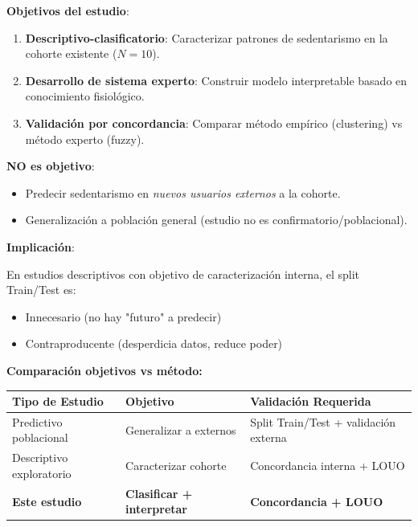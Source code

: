 \documentclass[12pt,letterpaper,twoside]{report}
\begin{document}
\begin{reglabox}
\textbf{Objetivos del estudio}:

\begin{enumerate}[noitemsep]
    \item \textbf{Descriptivo-clasificatorio}: Caracterizar patrones de sedentarismo en la cohorte existente ($N=10$).
    \item \textbf{Desarrollo de sistema experto}: Construir modelo interpretable basado en conocimiento fisiológico.
    \item \textbf{Validación por concordancia}: Comparar método empírico (clustering) vs método experto (fuzzy).
\end{enumerate}

\textbf{NO es objetivo}:
\begin{itemize}[noitemsep]
    \item Predecir sedentarismo en \textit{nuevos usuarios externos} a la cohorte.
    \item Generalización a población general (estudio no es confirmatorio/poblacional).
\end{itemize}

\textbf{Implicación}:

En estudios descriptivos con objetivo de caracterización interna, el split Train/Test es:
\begin{itemize}[noitemsep]
    \item Innecesario (no hay "futuro" a predecir)
    \item Contraproducente (desperdicia datos, reduce poder)
\end{itemize}
\end{reglabox}

\begin{calculobox}
\textbf{Comparación objetivos vs método:}

\begin{table}[H]
\centering
\begin{tabular}{@{}lll@{}}
\toprule
\textbf{Tipo de Estudio} & \textbf{Objetivo} & \textbf{Validación Requerida} \\
\midrule
Predictivo poblacional & Generalizar a externos & Split Train/Test + validación externa \\
Descriptivo exploratorio & Caracterizar cohorte & Concordancia interna + LOUO \\
\textbf{Este estudio} & \textbf{Clasificar + interpretar} & \textbf{Concordancia + LOUO} \\
\bottomrule
\end{tabular}
\end{table}
\end{calculobox}
\end{document}
